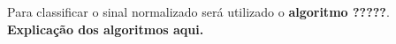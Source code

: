 \documentclass[conference]{IEEEtran}
\begin{document}
 
Para classificar o sinal normalizado será utilizado o \textbf{algoritmo ?????}. \textbf{Explicação dos algoritmos aqui.}

%
%



%
%
\end{document}
